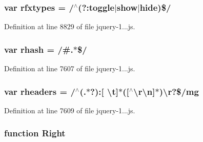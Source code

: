 \subsubsection[{rfxtypes}]{\setlength{\rightskip}{0pt plus 5cm}var rfxtypes = /$^\wedge$(?\+:{\bf toggle}$\vert$show$\vert$hide)\$/}\label{_scripts_2jquery-1_810_82_8js_a28b1e14ecaade6675453a292b2c1dba6}


Definition at line 8829 of file jquery-\/1...\+js.

\hypertarget{_scripts_2jquery-1_810_82_8js_a6990b6955b6bec9dd39f3814cfb56d6d}{}
\subsubsection[{rhash}]{\setlength{\rightskip}{0pt plus 5cm}var rhash = /\#.$\ast$\$/}\label{_scripts_2jquery-1_810_82_8js_a6990b6955b6bec9dd39f3814cfb56d6d}


Definition at line 7607 of file jquery-\/1...\+js.

\hypertarget{_scripts_2jquery-1_810_82_8js_af506d11612139f03091db71089d92e8b}{}
\subsubsection[{rheaders}]{\setlength{\rightskip}{0pt plus 5cm}var rheaders = /$^\wedge$(.$\ast$?)\+:\mbox{[} \textbackslash{}{\bf t}\mbox{]}$\ast$(\mbox{[}$^\wedge$\textbackslash{}r\textbackslash{}n\mbox{]}$\ast$)\textbackslash{}r?\$/mg}\label{_scripts_2jquery-1_810_82_8js_af506d11612139f03091db71089d92e8b}


Definition at line 7609 of file jquery-\/1...\+js.

\hypertarget{_scripts_2jquery-1_810_82_8js_ac7f66efc33d974809d85fc5bdb00c6eb}{}
\subsubsection[{Right}]{\setlength{\rightskip}{0pt plus 5cm}function Right}\label{_scripts_2jquery-1_810_82_8js_ac7f66efc33d974809d85fc5bdb00c6eb}


